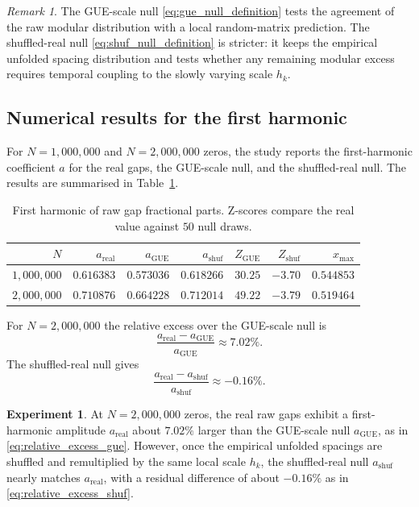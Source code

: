 \documentclass[11pt]{amsart}
\numberwithin{equation}{section}
\theoremstyle{plain}
\theoremstyle{definition}
\newtheorem{experiment}[theorem]{Experiment}
\theoremstyle{remark}
\newtheorem{remark}[theorem]{Remark}
\begin{document}
\begin{remark}
\label{rem:null_model_interpretation}
The GUE-scale null \eqref{eq:gue_null_definition}
tests the agreement of the raw modular distribution with
a local random-matrix prediction.
The shuffled-real null \eqref{eq:shuf_null_definition}
is stricter: it keeps the empirical unfolded spacing distribution
and tests whether any remaining modular excess requires
temporal coupling to the slowly varying scale $h_k$.
\end{remark}

\subsection{Numerical results for the first harmonic}
\label{subsec:numerical_first_harmonic}

For $N=1{,}000{,}000$ and $N=2{,}000{,}000$ zeros,
the study reports the first-harmonic coefficient $a$
for the real gaps, the GUE-scale null, and the shuffled-real null.
The results are summarised in Table~\ref{tab:first_harmonic}.

\begin{table}[htbp]
\centering
\caption{First harmonic of raw gap fractional parts.
Z-scores compare the real value against $50$ null draws.}
\label{tab:first_harmonic}
\begin{tabular}{@{}rrrrrrr@{}}
\toprule
$N$ & $a_{\mathrm{real}}$ & $a_{\mathrm{GUE}}$ & $a_{\mathrm{shuf}}$
& $Z_{\mathrm{GUE}}$ & $Z_{\mathrm{shuf}}$ & $x_{\max}$ \\
\midrule
$1{,}000{,}000$ & $0.616383$ & $0.573036$ & $0.618266$
& $30.25$ & $-3.70$ & $0.544853$ \\
$2{,}000{,}000$ & $0.710876$ & $0.664228$ & $0.712014$
& $49.22$ & $-3.79$ & $0.519464$ \\
\bottomrule
\end{tabular}
\end{table}

For $N=2{,}000{,}000$ the relative excess over the GUE-scale null is
\begin{equation}
\frac{a_{\mathrm{real}} - a_{\mathrm{GUE}}}{a_{\mathrm{GUE}}}
\approx 7.02\%.
\label{eq:relative_excess_gue}
\end{equation}
The shuffled-real null gives
\begin{equation}
\frac{a_{\mathrm{real}} - a_{\mathrm{shuf}}}{a_{\mathrm{shuf}}}
\approx -0.16\%.
\label{eq:relative_excess_shuf}
\end{equation}

\begin{experiment}
\label{exp:first_harmonic_excess}
At $N=2{,}000{,}000$ zeros,
the real raw gaps exhibit a first-harmonic amplitude $a_{\mathrm{real}}$
about $7.02\%$ larger than the GUE-scale null $a_{\mathrm{GUE}}$,
as in \eqref{eq:relative_excess_gue}.
However, once the empirical unfolded spacings are shuffled and
remultiplied by the same local scale $h_k$,
the shuffled-real null $a_{\mathrm{shuf}}$ nearly matches
$a_{\mathrm{real}}$, with a residual difference of about $-0.16\%$
as in \eqref{eq:relative_excess_shuf}.
\end{experiment}
\end{document}
